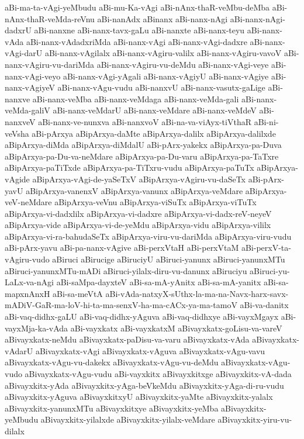 {aBi-ma-ta-vAgi-yeMbudu
aBi-mu-Ka-vAgi
aBi-nAnx-thaR-veMbu-deMba
aBi-nAnx-thaR-veMda-reVnu
aBi-nanAdx
aBinanx
aBi-nanx-nAgi
aBi-nanx-nAgi-dadxrU
aBi-nanxne
aBi-nanx-tavx-gaLu
aBi-nanxte
aBi-nanx-teyu
aBi-nanx-vAda
aBi-nanx-vAdadxriMda
aBi-nanx-vAgi
aBi-nanx-vAgi-dadxre
aBi-nanx-vAgi-darU
aBi-nanx-vAgilalx
aBi-nanx-vAgiru-valilx
aBi-nanx-vAgiru-vavoV
aBi-nanx-vAgiru-vu-dariMda
aBi-nanx-vAgiru-vu-deMdu
aBi-nanx-vAgi-veye
aBi-nanx-vAgi-veyo
aBi-nanx-vAgi-yAgali
aBi-nanx-vAgiyU
aBi-nanx-vAgiye
aBi-nanx-vAgiyeV
aBi-nanx-vAgu-vudu
aBi-nanxvU
aBi-nanx-vasutx-gaLige
aBi-nanxve
aBi-nanx-veMba
aBi-nanx-veMdaga
aBi-nanx-veMda-gali
aBi-nanx-veMda-galiV
aBi-nanx-veMdarU
aBi-nanx-veMdare
aBi-nanx-veMdeV
aBi-nanxveV
aBi-nanx-ve-nunxva
aBi-nanxvoV
aBi-na-va-viAyx-tiVthaR
aBi-ni-veVsha
aBi-pArxya
aBipArxya-daMte
aBipArxya-dalilx
aBipArxya-dalilxde
aBipArxya-diMda
aBipArxya-diMdalU
aBi-pArx-yakekx
aBipArxya-pa-Duva
aBipArxya-pa-Du-va-neMdare
aBipArxya-pa-Du-varu
aBipArxya-pa-TaTxre
aBipArxya-paTiTxde
aBipArxya-pa-TiTxru-vudu
aBipArxya-paTuTx
aBipArxya-vAgide
aBipArxya-vAgi-de-yaSeTxV
aBipArxya-vAgiru-vu-daSeTx
aBi-pArx-yavU
aBipArxya-vanenxV
aBipArxya-vanunx
aBipArxya-veMdare
aBipArxya-veV-neMdare
aBipArxya-veVnu
aBipArxya-viSuTx
aBipArxya-viTuTx
aBipArxya-vi-dadxlilx
aBipArxya-vi-dadxre
aBipArxya-vi-dadx-reV-neyeV
aBipArxya-vide
aBipArxya-vi-de-yeMdu
aBipArxya-vidu
aBipArxya-vililx
aBipArxya-vi-ra-bahudaSeTx
aBipArxya-viru-vu-dariMda
aBipArxya-viru-vudu
aBi-pArx-yavu
aBi-pa-nanx-vAgive
aBi-perxVtaH
aBi-perxVtaM
aBi-perxV-ta-vAgiru-vudo
aBiruci
aBirucige
aBiruciyU
aBiruci-yanunx
aBiruci-yanunxMTu
aBiruci-yanunxMTu-mADi
aBiruci-yilalx-diru-vu-danunx
aBiruciyu
aBiruci-yu-LaLx-va-nAgi
aBi-saMpa-dayxteV
aBi-sa-mA-yAnitx
aBi-sa-mA-yanitx
aBi-sa-mapxnAnxH
aBi-sa-meVtA
aBi-vAda-natxyX-sUthx-la-ma-na-Navx-harx-savx-mADiV-GaR-ma-loV-hi-ta-ma-senxV-ha-ma-cACx-ya-ma-tamoV
aBi-va-danitx
aBi-vaq-didhx-gaLU
aBi-vaq-didhx-yAguva
aBi-vaq-didhxye
aBi-vayxMgayx
aBi-vayxMja-ka-vAda
aBi-vayxkatx
aBi-vayxkatxM
aBivayxkatx-goLisu-va-vareV
aBivayxkatx-neMdu
aBivayxkatx-paDisu-va-varu
aBivayxkatx-vAda
aBivayxkatx-vAdarU
aBivayxkatx-vAgi
aBivayxkatx-vAguva
aBivayxkatx-vAgu-vavu
aBivayxkatx-vAgu-vu-dakekx
aBivayxkatx-vAgu-vu-deMdu
aBivayxkatx-vAgu-vudo
aBivayxkatx-vAgu-vudu
aBi-vayxkitx
aBivayxkitxge
aBivayxkitx-vA-dada
aBivayxkitx-yAda
aBivayxkitx-yAga-beVkeMdu
aBivayxkitx-yAga-di-ru-vudu
aBivayxkitx-yAguva
aBivayxkitxyU
aBivayxkitx-yaMte
aBivayxkitx-yalalx
aBivayxkitx-yanunxMTu
aBivayxkitxye
aBivayxkitx-yeMba
aBivayxkitx-yeMbudu
aBivayxkitx-yilalxde
aBivayxkitx-yilalx-veMdare
aBivayxkitx-yiru-vu-dilalx
}
